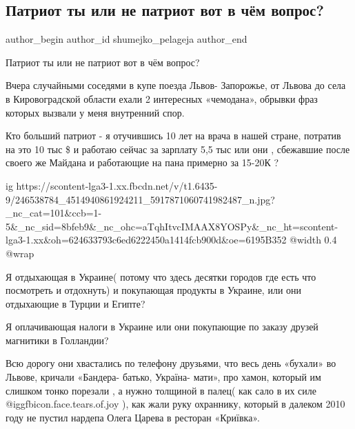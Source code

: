  
 
 
 
 
 
\subsection{Патриот ты или не патриот вот в чём вопрос?}
\label{sec:19_10_2021.fb.shumejko_pelageja.1.patriot_vopros_poezd}
 
\ifcmt
 author_begin
   author_id shumejko_pelageja
 author_end
\fi

Патриот ты или не патриот вот в чём вопрос?

Вчера случайными соседями в купе поезда Львов- Запорожье, от Львова до села в
Кировоградской области ехали 2 интересных «чемодана», обрывки фраз которых
вызвали у меня внутренний спор. 

Кто больший патриот - я отучившись 10 лет на врача в нашей стране, потратив на
это 10 тыс \$ и работаю сейчас за зарплату 5,5 тыс или они , сбежавшие после
своего же Майдана и работающие на  пана примерно за 15-20К ? 

\ifcmt
  ig https://scontent-lga3-1.xx.fbcdn.net/v/t1.6435-9/246538784_4514940861924211_5917871060741982487_n.jpg?_nc_cat=101&ccb=1-5&_nc_sid=8bfeb9&_nc_ohc=aTqhItvcIMAAX8YOSPy&_nc_ht=scontent-lga3-1.xx&oh=624633793c6ed6222450a1414fcb900d&oe=6195B352
  @width 0.4
  @wrap 
\fi

Я отдыхающая в Украине( потому что здесь десятки городов где есть что
посмотреть и отдохнуть) и покупающая продукты в Украине, или они отдыхающие в
Турции и Египте?

Я оплачивающая налоги в Украине или они покупающие по заказу друзей магнитики в
Голландии?

Всю дорогу они хвастались по телефону друзьями, что весь день «бухали» во
Львове, кричали «Бандера- батько, Україна- мати», про хамон, который им слишком
тонко порезали , а нужно толщиной в палец( как сало в их силе
@igg{fbicon.face.tears.of.joy} ), как жали руку охраннику, который в далеком
2010 году не пустил нардепа Олега Царева в ресторан «Криївка».

